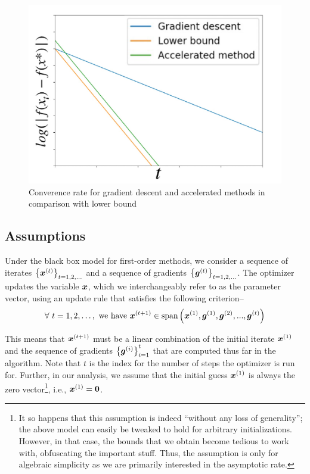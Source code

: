 \documentclass{article}
\begin{document}
\begin{figure}[h]
    \centering
    \includegraphics[scale=0.3]{img/gap.pdf}
    \caption{Converence rate for gradient descent and accelerated methods in comparison with lower bound}
    \label{conv}
\end{figure}


\subsection{Assumptions}
Under the black box model for first-order methods, we consider a sequence of iterates $\left\{{\bm{x}}^{(t)}\right\}_{t = 1, 2, \ldots}$ and a sequence of gradients $\left\{{\bm{g}}^{(t)}\right\}_{t = 1, 2, \ldots}$. 
The optimizer updates the variable ${\bm{x}}$, which we interchangeably refer to as the parameter vector, using an update rule that satisfies the following criterion--
\begin{equation*}
    \forall\,t = 1, 2, \ldots,\ \text{we have}\ 
    \vx^{(t+1)} \in \text{span}\left(\vx^{(1)},     \vg^{(1)}, \vg^{(2)}, ..., \vg^{(t)} 
    \right)
\end{equation*}

This means that ${\bm{x}}^{(t+1)}$ must be a linear combination of the initial iterate ${\bm{x}}^{(1)}$ and the sequence of gradients $\left\{{\bm{g}}^{(i)}\right\}_{i = 1}^t$ that are computed thus far in the algorithm. 
Note that $t$ is the index for the number of steps the optimizer is run for. 
Further, in our analysis, we assume that the initial guess ${\bm{x}}^{(1)}$ is always the zero vector\footnote{
    It so happens that this assumption is indeed ``without any loss of generality''; the above model can easily be tweaked to hold for arbitrary initializations.
    However, in that case, the bounds that we obtain become tedious to work with, obfuscating the important stuff.
    Thus, the assumption is only for algebraic simplicity as we are primarily interested in the asymptotic rate.
}, i.e., ${\bm{x}}^{(1)} = \mathbf{0}$.
\end{document}
